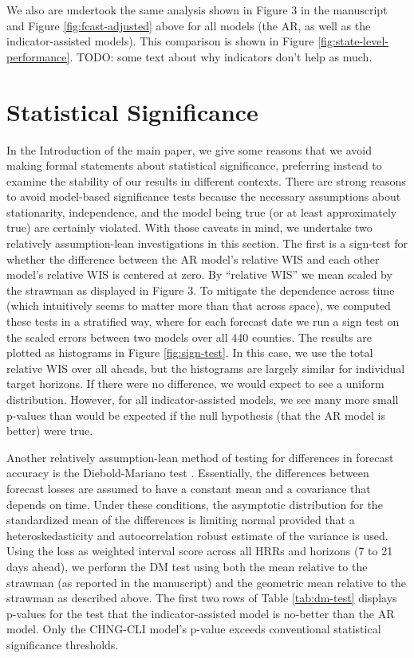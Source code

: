 We also are undertook the same analysis shown in Figure 3 in the manuscript and Figure
\ref{fig:fcast-adjusted} above for all models
(the AR, as well as the indicator-assisted models). This comparison is shown in Figure
\ref{fig:state-level-performance}. 
%
TODO: some text about why indicators don't help as much.


\section{Statistical Significance}

In the Introduction of the main paper, we give some reasons that we avoid making
formal statements about statistical significance, preferring instead to examine
the stability of our results in different contexts. There are strong reasons to
avoid model-based significance tests because the necessary assumptions about
stationarity, independence, and the  model being true (or at least approximately
true) are certainly violated. With those caveats in mind, we undertake two
relatively assumption-lean investigations in this section. The first is a
sign-test for whether the difference between the AR model’s relative WIS  and
each other model’s relative WIS is centered at zero. By ``relative WIS'' we mean
scaled by the strawman as displayed in Figure 3. To mitigate the dependence
across time (which intuitively seems to matter more than that across space), we
computed these tests in a stratified way, where for each forecast date we run a
sign test on the scaled errors between two models over all 440 counties. The
results are plotted as histograms in Figure \ref{fig:sign-test}. In this case,
we use the total relative WIS over all aheads, but the histograms are largely
similar for individual target horizons. If there were no difference, we would
expect to see a uniform distribution. However, for all indicator-assisted
models, we see many more small p-values than would be expected if the null
hypothesis (that the AR model is better) were true.

Another relatively assumption-lean method of testing for differences in forecast
accuracy is the Diebold-Mariano test \cite{Diebold:2002, Diebold:2015,
Harvey:1997}. Essentially, the differences between forecast losses are assumed
to have a constant mean and a covariance that depends on time. Under these
conditions, the asymptotic distribution for the standardized mean of the
differences is limiting normal provided that a heteroskedasticity and
autocorrelation robust estimate of the variance is used. Using the loss as
weighted interval score across all HRRs and horizons (7 to 21 days ahead), we
perform the DM test using both the mean relative to the strawman (as reported in
the manuscript) and the geometric mean relative to the strawman as described
above. The first two rows of Table \ref{tab:dm-test} displays p-values for the
test that the indicator-assisted model is no-better than the AR model. Only the
CHNG-CLI model's p-value exceeds conventional statistical significance
thresholds.

